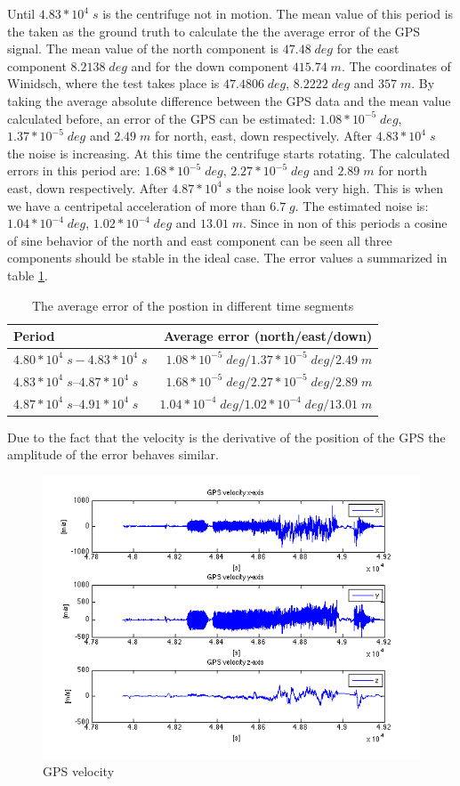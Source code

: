 Until $4.83*10^{4}\; s$ is the centrifuge not in motion. The mean value of this period is the taken as the ground truth to calculate the the average error of the GPS signal. The mean value of the north component is $47.48\;deg$ for the east component $8.2138\;deg$ and for the down component $415.74\;m$. The coordinates of Winidsch, where the test takes place is $47.4806\;deg$, $8.2222\;deg$ and $357\;m$. By taking the average absolute difference between the GPS data and the mean value calculated before, an error of the GPS can be estimated: $1.08*10^{-5}\;deg$, $1.37*10^{-5}\;deg$ and $2.49\;m$ for north, east, down respectively. After $4.83*10^{4}\;s$ the noise is increasing. At this time the centrifuge starts rotating. The calculated  errors in this period are: $1.68*10^{-5}\;deg$, $2.27*10^{-5}\;deg$ and $2.89\;m$ for north east, down respectively. After $4.87*10^{4}\;s$ the noise look very high. This is when we have  a centripetal acceleration of more than  $6.7\;g$. The estimated noise is: $1.04*10^{-4}\;deg$, $1.02*10^{-4}\;deg$ and $13.01\;m$. Since in non of this periods a cosine of sine behavior of the north and east component can be seen all three components should be stable in the ideal case. The error values a summarized in table \ref{ct_pos_error}.
\begin{table}[h]
\centering
\begin{tabular}{|l|r|}
\hline
Period & Average error (north/east/down) \\
\hline
$4.80*10^{4}\;s - 4.83*10^{4}\;s$&$1.08*10^{-5}\;deg / 1.37*10^{-5}\;deg / 2.49\;m$\\
\hline
$4.83*10^{4}\;s – 4.87*10^{4}\;s$&$1.68*10^{-5}\;deg / 2.27*10^{-5}\;deg / 2.89\;m$\\
\hline
$4.87*10^{4}\;s – 4.91*10^{4}\;s$&$1.04*10^{-4}\;deg/ 1.02*10^{-4}\;deg / 13.01\;m$\\
\hline
\end{tabular}
\caption{The average error of the postion in different time segments}
\label{ct_pos_error}
\end{table}
Due to the fact that the velocity is the derivative of the position of the GPS the amplitude of the error behaves  similar.
\begin{figure}[hb]
\centering
\includegraphics[width=1\textwidth]{pictures/ct_vel.png}
\caption{GPS velocity}
\label{ct_vel}
\end{figure}

